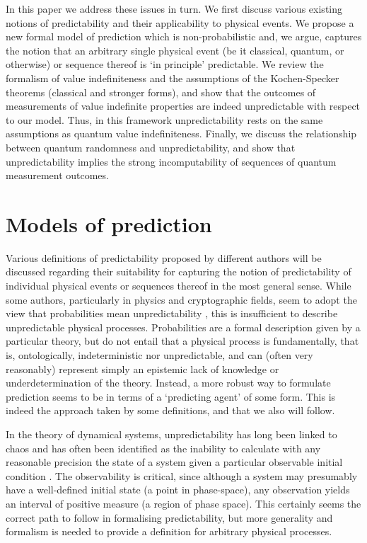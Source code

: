 \documentclass[%
 superscriptaddress,
 preprint,
 showpacs,
 showkeys,
 preprintnumbers,
  amsmath,amssymb,
  aps,
 pra,
  longbibliography,
  floatfix,
 ]{revtex4-1}
\theoremstyle{definition}
\begin{document}
In this paper we address these issues in turn.
We first discuss various existing notions of predictability and their applicability to physical events.
We propose a new formal model of prediction which is non-probabilistic and, we argue, captures the notion that an arbitrary single physical event (be it classical, quantum, or otherwise) or sequence thereof is `in principle' predictable.
We review the formalism of value indefiniteness and the assumptions of the Kochen-Specker theorems (classical and stronger forms), and show that the outcomes of measurements of value indefinite properties are indeed unpredictable with respect to our model.
Thus, in this framework unpredictability  rests on the same assumptions as quantum value indefiniteness.
Finally, we discuss the relationship between quantum randomness and unpredictability, and show that unpredictability implies 
the strong incomputability of sequences of quantum measurement outcomes.


\section{Models of prediction}

Various definitions of predictability  proposed by different authors will be discussed regarding their suitability for capturing the notion of predictability of individual physical events or sequences thereof in the most general sense.
While some authors, particularly in physics and cryptographic fields, seem to adopt the view that probabilities mean unpredictability \cite{Acin:2013qa,zeil-05_nature_ofQuantum}, this is insufficient to describe unpredictable physical processes.
Probabilities are a formal description given by a particular theory, but do not entail that a physical process is fundamentally, that is, ontologically, indeterministic nor unpredictable, and can (often very reasonably) represent simply an epistemic lack of knowledge or underdetermination of the theory.
Instead, a more robust way to formulate prediction seems to be in terms of a `predicting agent' of some form.
This is indeed the approach taken by some definitions, and that we also will follow.

In the theory of dynamical systems, unpredictability has long been linked to chaos and has often been identified as the inability to calculate with any reasonable precision the state of a system given a particular observable initial condition \cite{Werndl:2009nx}.
The observability is critical, since although a system may presumably have a well-defined initial state (a point in phase-space), any observation yields an interval of positive measure (a region of phase space).
This certainly seems the correct path to follow in formalising predictability, but more generality and formalism is needed to provide a definition for arbitrary physical processes.
\end{document}
